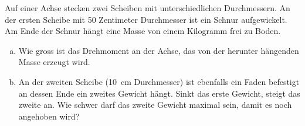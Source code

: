 \documentclass[12pt,a5paper,twoside]{article}
\begin{document}
\begin{aufgabe}
	Auf einer Achse stecken zwei Scheiben mit unterschiedlichen Durchmessern.
	An der ersten Scheibe mit 50 Zentimeter Durchmesser ist ein Schnur aufgewickelt.
	Am Ende der Schnur hängt eine Masse von einem Kilogramm frei zu Boden.

	\begin{enumerate} [a)]
		\item Wie gross ist das Drehmoment an der Achse, das von der herunter hängenden Masse erzeugt wird.
		\item An der zweiten Scheibe (\SI{10}{cm} Durchmesser) ist ebenfalls ein Faden befestigt an dessen Ende ein zweites Gewicht hängt.
			Sinkt das erste Gewicht, steigt das zweite an. Wie schwer darf das zweite Gewicht maximal sein, damit es noch angehoben wird?
	\end{enumerate}

\end{aufgabe}
\end{document}
